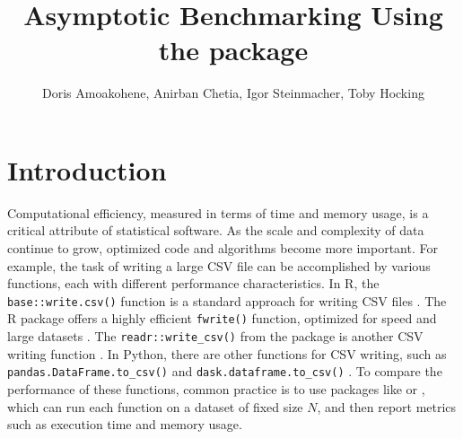 \title{Asymptotic Benchmarking Using the  package}
\author{Doris Amoakohene, Anirban Chetia, Igor Steinmacher, Toby Hocking}

\maketitle


\section{Introduction}

Computational efficiency, measured in terms of time and memory usage, is a critical attribute of statistical software. As the scale and complexity of data continue to grow, optimized code and algorithms become more important.
For example, the task of writing a large CSV file can be accomplished by various functions, each with different performance characteristics. 
In R, the \texttt{base::write.csv()} function is a standard approach for writing CSV files \citep{baseR}.
The R package  offers a highly efficient \texttt{fwrite()} function, optimized for speed and large datasets \citep{data.table}. 
The \texttt{readr::write\_csv()} from the  package is another CSV writing function \citep{readr}.
In Python, there are other functions for CSV writing, such as \texttt{pandas.DataFrame.to\_csv()} and \texttt{dask.dataframe.to\_csv()}  \citep{pandas, dask}.
To compare the performance of these functions, common practice is to use packages like  \citep{microbenchmark} or  \citep{bench}, which can run each function on a dataset of fixed size $N$, and then report metrics such as execution time and memory usage.

